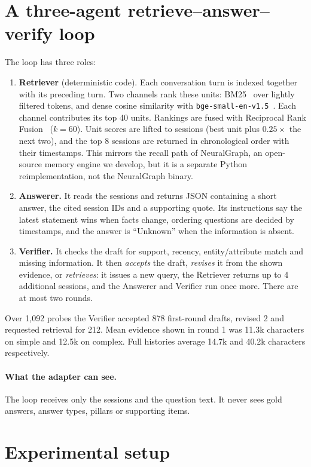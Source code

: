 \documentclass[11pt]{article}
\begin{document}
\section{A three-agent retrieve--answer--verify loop}\label{sec:loop}
The loop has three roles:
\begin{enumerate}
\item \textbf{Retriever} (deterministic code). Each conversation turn is indexed together with its preceding turn. Two channels rank these units: BM25~\citep{robertson2009bm25} over lightly filtered tokens, and dense cosine similarity with \texttt{bge-small-en-v1.5}~\citep{xiao2023cpack}. Each channel contributes its top 40 units. Rankings are fused with Reciprocal Rank Fusion~\citep{cormack2009rrf} ($k{=}60$). Unit scores are lifted to sessions (best unit plus $0.25\times$ the next two), and the top 8 sessions are returned in chronological order with their timestamps. This mirrors the recall path of NeuralGraph, an open-source memory engine we develop, but it is a separate Python reimplementation, not the NeuralGraph binary.
\item \textbf{Answerer.} It reads the sessions and returns JSON containing a short answer, the cited session IDs and a supporting quote. Its instructions say the latest statement wins when facts change, ordering questions are decided by timestamps, and the answer is ``Unknown'' when the information is absent.
\item \textbf{Verifier.} It checks the draft for support, recency, entity/attribute match and missing information. It then \emph{accepts} the draft, \emph{revises} it from the shown evidence, or \emph{retrieves}: it issues a new query, the Retriever returns up to 4 additional sessions, and the Answerer and Verifier run once more. There are at most two rounds.
\end{enumerate}
Over 1{,}092 probes the Verifier accepted 878 first-round drafts, revised 2 and requested retrieval for 212. Mean evidence shown in round 1 was 11.3k characters on simple and 12.5k on complex. Full histories average 14.7k and 40.2k characters respectively.

\paragraph{What the adapter can see.} The loop receives only the sessions and the question text. It never sees gold answers, answer types, pillars or supporting items.

\section{Experimental setup}\label{sec:setup}
\end{document}

